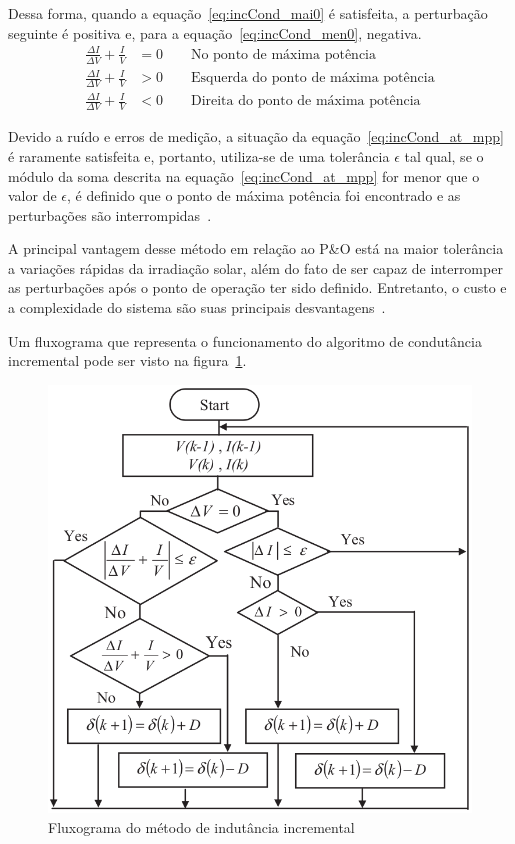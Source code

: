 \documentclass[
	12pt,				%
	openright,			%
	twoside,			%
	a4paper,			%
	english,			%
	french,				%
	spanish,			%
	brazil,				%
	]{abntex2}
\begin{document}
Dessa forma, quando a equação~\ref{eq:incCond_mai0} é satisfeita, a perturbação seguinte é positiva e, para a equação~\ref{eq:incCond_men0}, negativa.
\begin{align}%
	\frac{\Delta I}{\Delta V} + \frac{I}{V} &= 0 \qquad \text{No ponto de máxima potência} \label{eq:incCond_at_mpp}\\
	\frac{\Delta I}{\Delta V} + \frac{I}{V} &> 0 \qquad \text{Esquerda do ponto de máxima potência} \label{eq:incCond_mai0}\\
	\frac{\Delta I}{\Delta V} + \frac{I}{V} &< 0 \qquad \text{Direita do ponto de máxima potência} \label{eq:incCond_men0}
\end{align}

Devido a ruído e erros de medição, a situação da equação~\ref{eq:incCond_at_mpp} é raramente satisfeita e, portanto, utiliza-se de uma tolerância $\epsilon$ tal qual, se o módulo da soma descrita na equação~\ref{eq:incCond_at_mpp} for menor que o valor de $\epsilon$, é definido que o ponto de máxima potência foi encontrado e as perturbações são interrompidas~\cite{Talha_MPPT}.

A principal vantagem desse método em relação ao P\&O está na maior tolerância a variações rápidas da irradiação solar, além do fato de ser capaz de interromper as perturbações após o ponto de operação ter sido definido. Entretanto, o custo e a complexidade do sistema são suas principais desvantagens~\cite{MPPT_P&O_IC}.

Um fluxograma que representa o funcionamento do algoritmo de condutância incremental pode ser visto na figura~\ref{fig:IncCond_Flux}.

\begin{figure}[htb]
	\begin{center}
		\includegraphics[width=0.55 \linewidth]{incCond_flow}
		\caption{Fluxograma do método de indutância incremental~\cite{Talha_MPPT}}
		\label{fig:IncCond_Flux}
	\end{center}
\end{figure}
\end{document}
